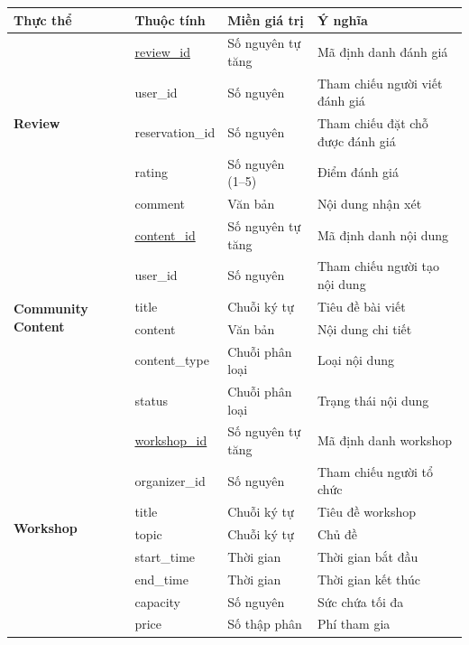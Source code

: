 \begin{table}[htbp]
    \centering
    \label{tab:data_dictionary_5}
    \renewcommand{\arraystretch}{1.3}
    \scriptsize
    \begin{tabular}{|l|l|l|p{5.5cm}|}
        \hline
        \textbf{Thực thể} & \textbf{Thuộc tính} & \textbf{Miền giá trị} & \textbf{Ý nghĩa} \\ \hline
        \multirow{5}{*}{\textbf{Review}}
        & \underline{review\_id} & Số nguyên tự tăng & Mã định danh đánh giá \\ \cline{2-4}
        & user\_id & Số nguyên & Tham chiếu người viết đánh giá \\ \cline{2-4}
        & reservation\_id & Số nguyên & Tham chiếu đặt chỗ được đánh giá \\ \cline{2-4}
        & rating & Số nguyên (1--5) & Điểm đánh giá \\ \cline{2-4}
        & comment & Văn bản & Nội dung nhận xét \\ \hline
        \multirow{6}{*}{\textbf{Community Content}}
        & \underline{content\_id} & Số nguyên tự tăng & Mã định danh nội dung \\ \cline{2-4}
        & user\_id & Số nguyên & Tham chiếu người tạo nội dung \\ \cline{2-4}
        & title & Chuỗi ký tự & Tiêu đề bài viết \\ \cline{2-4}
        & content & Văn bản & Nội dung chi tiết \\ \cline{2-4}
        & content\_type & Chuỗi phân loại & Loại nội dung \\ \cline{2-4}
        & status & Chuỗi phân loại & Trạng thái nội dung \\ \hline
        \multirow{8}{*}{\textbf{Workshop}}
        & \underline{workshop\_id} & Số nguyên tự tăng & Mã định danh workshop \\ \cline{2-4}
        & organizer\_id & Số nguyên & Tham chiếu người tổ chức \\ \cline{2-4}
        & title & Chuỗi ký tự & Tiêu đề workshop \\ \cline{2-4}
        & topic & Chuỗi ký tự & Chủ đề \\ \cline{2-4}
        & start\_time & Thời gian & Thời gian bắt đầu \\ \cline{2-4}
        & end\_time & Thời gian & Thời gian kết thúc \\ \cline{2-4}
        & capacity & Số nguyên & Sức chứa tối đa \\ \cline{2-4}
        & price & Số thập phân & Phí tham gia \\ \hline

\end{tabular}
\end{table}
